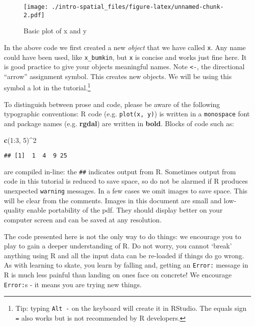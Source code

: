 \documentclass[]{article}
\newenvironment{Shaded}{}{}
\newcommand{\KeywordTok}[1]{\textcolor[rgb]{0.00,0.44,0.13}{\textbf{{#1}}}}
\newcommand{\DecValTok}[1]{\textcolor[rgb]{0.25,0.63,0.44}{{#1}}}
\newcommand{\NormalTok}[1]{{#1}}
\begin{document}
\begin{figure}[htbp]
\centering
\texttt{[image: ./intro-spatial\_files/figure-latex/unnamed-chunk-2.pdf]}
\caption{Basic plot of x and y}
\end{figure}

In the above code we first created a new \emph{object} that we have
called \texttt{x}. Any name could have been used, like
\texttt{x\_bumkin}, but \texttt{x} is concise and works just fine here.
It is good practice to give your objects meaningful names. Note
\texttt{\textless{}-}, the directional ``arrow'' assignment symbol. This
creates new objects. We will be using this symbol a lot in the
tutorial.\footnote{Tip: typing \texttt{Alt -} on the keyboard will
  create it in RStudio. The equals sign \texttt{=} also works but is not
  recommended by R developers.}

To distinguish between prose and code, please be aware of the following
typographic conventions: R code (e.g. \texttt{plot(x, y)}) is written in
a \texttt{monospace} font and package names (e.g. \textbf{rgdal}) are
written in \textbf{bold}. Blocks of code such as:

\begin{Shaded}
\begin{Highlighting}[]
\KeywordTok{c}\NormalTok{(}\DecValTok{1}\NormalTok{:}\DecValTok{3}\NormalTok{, }\DecValTok{5}\NormalTok{)^}\DecValTok{2}
\end{Highlighting}
\end{Shaded}

\begin{verbatim}
## [1]  1  4  9 25
\end{verbatim}

are compiled in-line: the \texttt{\#\#} indicates output from R.
Sometimes output from code in this tutorial is reduced to save space, so
do not be alarmed if R produces unexpected \texttt{warning} messages. In
a few cases we omit images to save space. This will be clear from the
comments. Images in this document are small and low-quality enable
portability of the pdf. They should display better on your computer
screen and can be saved at any resolution.

The code presented here is not the only way to do things: we encourage
you to play to gain a deeper understanding of R. Do not worry, you
cannot `break' anything using R and all the input data can be re-loaded
if things do go wrong. As with learning to skate, you learn by falling
and, getting an \texttt{Error:} message in R is much less painful than
landing on ones face on concrete! We encourage \texttt{Error:}s - it
means you are trying new things.
\end{document}
